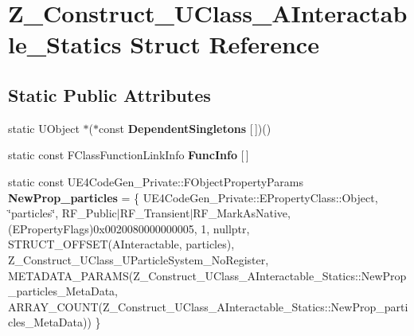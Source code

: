 \hypertarget{struct_z___construct___u_class___a_interactable___statics}{}\section{Z\+\_\+\+Construct\+\_\+\+U\+Class\+\_\+\+A\+Interactable\+\_\+\+Statics Struct Reference}
\label{struct_z___construct___u_class___a_interactable___statics}
\subsection*{Static Public Attributes}
\begin{DoxyCompactItemize}
\item 
\mbox{\label{struct_z___construct___u_class___a_interactable___statics_abd175d8d4373bc77c3f36bd65c0383e1}} 
static U\+Object $\ast$($\ast$const {\bfseries Dependent\+Singletons} \mbox{[}$\,$\mbox{]})()
\item 
static const F\+Class\+Function\+Link\+Info {\bfseries Func\+Info} \mbox{[}$\,$\mbox{]}
\item 
\mbox{\label{struct_z___construct___u_class___a_interactable___statics_a685fff2643d37e6baa96d23118e9a714}} 
static const U\+E4\+Code\+Gen\+\_\+\+Private\+::\+F\+Object\+Property\+Params {\bfseries New\+Prop\+\_\+particles} = \{ U\+E4\+Code\+Gen\+\_\+\+Private\+::\+E\+Property\+Class\+::\+Object, \char`\"{}particles\char`\"{}, R\+F\+\_\+\+Public$\vert$R\+F\+\_\+\+Transient$\vert$R\+F\+\_\+\+Mark\+As\+Native, (E\+Property\+Flags)0x0020080000000005, 1, nullptr, S\+T\+R\+U\+C\+T\+\_\+\+O\+F\+F\+S\+E\+T(\+A\+Interactable, particles), Z\+\_\+\+Construct\+\_\+\+U\+Class\+\_\+\+U\+Particle\+System\+\_\+\+No\+Register, M\+E\+T\+A\+D\+A\+T\+A\+\_\+\+P\+A\+R\+A\+M\+S(\+Z\+\_\+\+Construct\+\_\+\+U\+Class\+\_\+\+A\+Interactable\+\_\+\+Statics\+::\+New\+Prop\+\_\+particles\+\_\+\+Meta\+Data, A\+R\+R\+A\+Y\+\_\+\+C\+O\+U\+N\+T(\+Z\+\_\+\+Construct\+\_\+\+U\+Class\+\_\+\+A\+Interactable\+\_\+\+Statics\+::\+New\+Prop\+\_\+particles\+\_\+\+Meta\+Data)) \}
\item 
\mbox{\label{struct_z___construct___u_class___a_interactable___statics_aa8fffa80f0f9e1595c213460dc23f5f6}} 

\end{DoxyCompactItemize}
